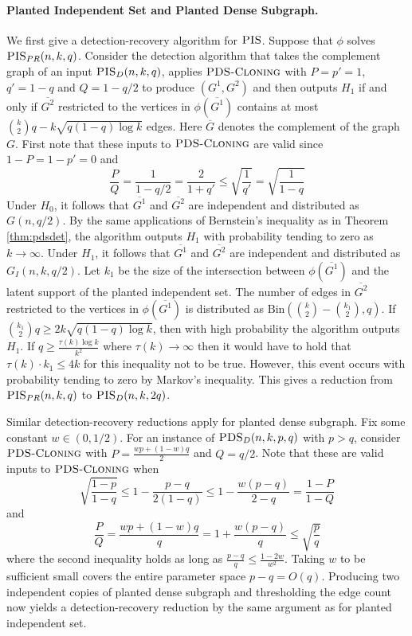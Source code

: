 \paragraph{Planted Independent Set and Planted Dense Subgraph.} We first give a detection-recovery algorithm for $\textsc{PIS}$. Suppose that $\phi$ solves $\textsc{PIS}_{PR}(n, k, q)$. Consider the detection algorithm that takes the complement graph of an input $\textsc{PIS}_{D}(n, k, q)$, applies $\textsc{PDS-Cloning}$ with $P = p' = 1$, $q' = 1 - q$ and $Q = 1 - q/2$ to produce $(G^1, G^2)$ and then outputs $H_1$ if and only if $\overline{G^2}$ restricted to the vertices in $\phi(\overline{G^1})$ contains at most $\binom{k}{2} q - k\sqrt{q(1 - q) \log k}$ edges. Here $\overline{G}$ denotes the complement of the graph $G$. First note that these inputs to $\textsc{PDS-Cloning}$ are valid since $1 - P = 1 - p' = 0$ and
$$\frac{P}{Q} = \frac{1}{1-q/2} = \frac{2}{1 + q'} \le \sqrt{\frac{1}{q'}} = \sqrt{\frac{1}{1-q}}$$
Under $H_0$, it follows that $\overline{G^1}$ and $\overline{G^2}$ are independent and distributed as $G(n, q/2)$. By the same applications of Bernstein's inequality as in Theorem \ref{thm:pdsdet}, the algorithm outputs $H_1$ with probability tending to zero as $k \to \infty$. Under $H_1$, it follows that $\overline{G^1}$ and $\overline{G^2}$ are independent and distributed as $G_I(n, k, q/2)$. Let $k_1$ be the size of the intersection between $\phi(\overline{G^1})$ and the latent support of the planted independent set. The number of edges in $\overline{G^2}$ restricted to the vertices in $\phi(\overline{G^1})$ is distributed as $\text{Bin}( \binom{k}{2} - \binom{k_1}{2}, q )$. If $\binom{k_1}{2} q \ge 2k\sqrt{q(1 - q) \log k}$, then with high probability the algorithm outputs $H_1$. If $q \ge \frac{\tau(k) \log k}{k^2}$ where $\tau(k) \to \infty$ then it would have to hold that $\tau(k) \cdot k_1 \le 4k$ for this inequality not to be true. However, this event occurs with probability tending to zero by Markov's inequality. This gives a reduction from $\textsc{PIS}_{PR}(n, k, q)$ to $\textsc{PIS}_D(n, k, 2q)$.

Similar detection-recovery reductions apply for planted dense subgraph. Fix some constant $w \in (0, 1/2)$. For an instance of $\textsc{PDS}_D(n, k, p, q)$ with $p > q$, consider $\textsc{PDS-Cloning}$ with $P = \frac{wp+(1-w)q}{2}$ and $Q = q/2$. Note that these are valid inputs to $\textsc{PDS-Cloning}$ when
$$\sqrt{\frac{1 - p}{1 - q}} \le 1 - \frac{p - q}{2(1 - q)} \le 1 - \frac{w(p - q)}{2 - q} = \frac{1 - P}{1 - Q}$$
and
$$\frac{P}{Q} = \frac{wp+(1-w)q}{q} = 1 + \frac{w(p - q)}{q} \le \sqrt{\frac{p}{q}}$$
where the second inequality holds as long as $\frac{p - q}{q} \le \frac{1 - 2w}{w^2}$. Taking $w$ to be sufficient small covers the entire parameter space $p - q = O(q)$. Producing two independent copies of planted dense subgraph and thresholding the edge count now yields a detection-recovery reduction by the same argument as for planted independent set.

